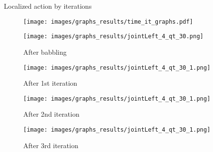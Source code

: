 \documentclass[aspectratio=169]{beamer}
\begin{document}
\begin{frame}{Localized action by iterations}
	\vspace{-0.7em}
	\begin{minipage}{\linewidth}	
		\begin{figure}[h!]
			\texttt{[image: images/graphs\_results/time\_it\_graphs.pdf]}
			\label{fig:object_representation}
		\end{figure}
	\end{minipage}
	\begin{minipage}{0.24\linewidth}	
		\begin{figure}[h!]
			\texttt{[image: images/graphs\_results/jointLeft\_4\_qt\_30.png]}
			\label{fig:object_representation}
			\vspace{-0.5em}
			\caption{After babbling}
		\end{figure}
	\end{minipage}
	\begin{minipage}{0.24\linewidth}	
		\begin{figure}[h!]
			\texttt{[image: images/graphs\_results/jointLeft\_4\_qt\_30\_1.png]}
			\label{fig:object_representation}
			\vspace{-0.5em}
			\caption{After 1st iteration}
		\end{figure}
	\end{minipage}
	\begin{minipage}{0.24\linewidth}	
		\begin{figure}[h!]
			\texttt{[image: images/graphs\_results/jointLeft\_4\_qt\_30\_1.png]}
			\label{fig:object_representation}
			\vspace{-0.5em}
			\caption{After 2nd iteration}
		\end{figure}
	\end{minipage}
	\begin{minipage}{0.24\linewidth}	
		\begin{figure}[h!]
			\texttt{[image: images/graphs\_results/jointLeft\_4\_qt\_30\_1.png]}
			\label{fig:object_representation}
			\vspace{-0.5em}
			\caption{After 3rd iteration}
		\end{figure}
	\end{minipage}		
\end{frame}
\end{document}

